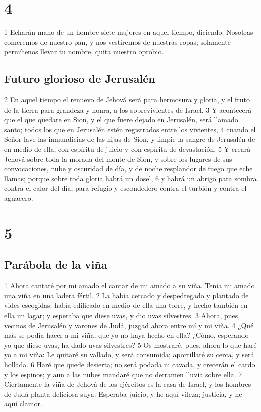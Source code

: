 \chapter{4}

1 Echarán mano de un hombre siete mujeres en aquel tiempo, diciendo: Nosotras comeremos de nuestro pan, y nos vestiremos de nuestras ropas; solamente permítenos llevar tu nombre, quita nuestro oprobio.

\section*{Futuro glorioso de Jerusalén}

2 En aquel tiempo el renuevo de Jehová será para hermosura y gloria, y el fruto de la tierra para grandeza y honra, a los sobrevivientes de Israel.
3 Y acontecerá que el que quedare en Sion, y el que fuere dejado en Jerusalén, será llamado santo; todos los que en Jerusalén estén registrados entre los vivientes,
4 cuando el Señor lave las inmundicias de las hijas de Sion, y limpie la sangre de Jerusalén de en medio de ella, con espíritu de juicio y con espíritu de devastación.
5 Y creará Jehová sobre toda la morada del monte de Sion, y sobre los lugares de sus convocaciones, nube y oscuridad de día, y de noche resplandor de fuego que eche llamas; porque sobre toda gloria habrá un dosel,
6 y habrá un abrigo para sombra contra el calor del día, para refugio y escondedero contra el turbión y contra el aguacero.

\chapter{5}

\section*{Parábola de la viña}

1 Ahora cantaré por mi amado el cantar de mi amado a su viña. Tenía mi amado una viña en una ladera fértil.
2 La había cercado y despedregado y plantado de vides escogidas; había edificado en medio de ella una torre, y hecho también en ella un lagar; y esperaba que diese uvas, y dio uvas silvestres.
3 Ahora, pues, vecinos de Jerusalén y varones de Judá, juzgad ahora entre mí y mi viña.
4 ¿Qué más se podía hacer a mi viña, que yo no haya hecho en ella? ¿Cómo, esperando yo que diese uvas, ha dado uvas silvestres?
5 Os mostraré, pues, ahora lo que haré yo a mi viña: Le quitaré su vallado, y será consumida; aportillaré su cerca, y será hollada.
6 Haré que quede desierta; no será podada ni cavada, y crecerán el cardo y los espinos; y aun a las nubes mandaré que no derramen lluvia sobre ella.
7 Ciertamente la viña de Jehová de los ejércitos es la casa de Israel, y los hombres de Judá planta deliciosa suya. Esperaba juicio, y he aquí vileza; justicia, y he aquí clamor.

